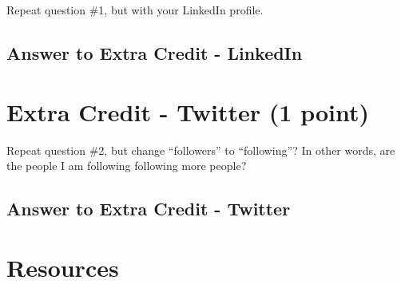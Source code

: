 \documentclass{article}
\begin{document}
Repeat question \#1, but with your LinkedIn profile.

\subsection*{Answer to Extra Credit - LinkedIn}

\clearpage

\section*{Extra Credit - Twitter (1 point)}

Repeat question \#2, but change ``followers'' to ``following''? In other words, are the people I am following following more people?

\subsection*{Answer to Extra Credit - Twitter}

\clearpage

\section*{Resources}
\end{document}
